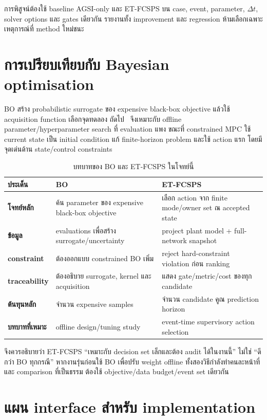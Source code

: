\documentclass[12pt,a4paper]{article}
\begin{document}
การพิสูจน์ต้องใช้ baseline AGSI-only และ ET-FCSPS บน case, event, parameter, $\Delta t$,
solver options และ gates เดียวกัน รายงานทั้ง improvement และ regression ห้ามเลือกเฉพาะเหตุการณ์ที่ method ใหม่ชนะ

\section{การเปรียบเทียบกับ Bayesian optimisation}

BO สร้าง probabilistic surrogate ของ expensive black-box objective แล้วใช้ acquisition function เลือกจุดทดลอง
ถัดไป~\cite{frazier2018,snoek2012} จึงเหมาะกับ offline parameter/hyperparameter search ที่ evaluation แพง
ขณะที่ constrained MPC ใช้ current state เป็น initial condition แก้ finite-horizon problem และใช้ action แรก
โดยมีจุดเด่นด้าน state/control constraints~\cite{mayne2000}

\begin{table}[H]
\centering
\caption{บทบาทของ BO และ ET-FCSPS ในโจทย์นี้}
\begin{tabularx}{\textwidth}{>{\bfseries}p{}XX}
\toprule
ประเด็น & BO & ET-FCSPS \\
\midrule
โจทย์หลัก & ค้น parameter ของ expensive black-box objective & เลือก action จาก finite mode/owner set ณ accepted state \\
ข้อมูล & evaluations เพื่อสร้าง surrogate/uncertainty & project plant model + full-network snapshot \\
constraint & ต้องออกแบบ constrained BO เพิ่ม & reject hard-constraint violation ก่อน ranking \\
traceability & ต้องอธิบาย surrogate, kernel และ acquisition & แสดง gate/metric/cost ของทุก candidate \\
ต้นทุนหลัก & จำนวน expensive samples & จำนวน candidate คูณ prediction horizon \\
บทบาทที่เหมาะ & offline design/tuning study & event-time supervisory action selection \\
\bottomrule
\end{tabularx}
\end{table}

จึงควรอธิบายว่า ET-FCSPS ``เหมาะกับ decision set เล็กและต้อง audit ได้ในงานนี้'' ไม่ใช่ ``ดีกว่า BO
ทุกกรณี'' หากงานรุ่นก่อนใช้ BO เพื่อปรับ weight offline ทั้งสองวิธีกำลังทำคนละหน้าที่ และ comparison ที่เป็นธรรม
ต้องใช้ objective/data budget/event set เดียวกัน

\section{แผน interface สำหรับ implementation}
\end{document}
